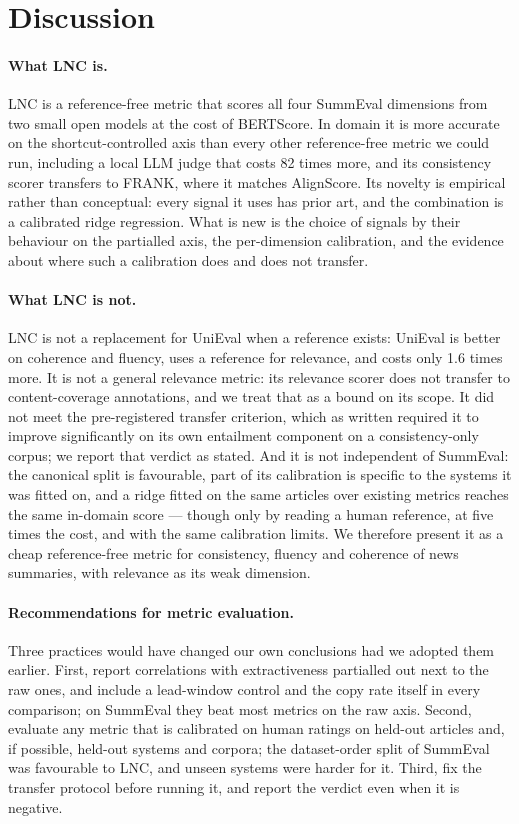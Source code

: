 \section{Discussion}
\label{sec:discussion}

\paragraph{What LNC is.} LNC is a reference-free metric that scores all four SummEval dimensions from two small open models at the cost of BERTScore. In domain it is more accurate on the shortcut-controlled axis than every other reference-free metric we could run, including a local LLM judge that costs 82 times more, and its consistency scorer transfers to FRANK, where it matches AlignScore. Its novelty is empirical rather than conceptual: every signal it uses has prior art, and the combination is a calibrated ridge regression. What is new is the choice of signals by their behaviour on the partialled axis, the per-dimension calibration, and the evidence about where such a calibration does and does not transfer.

\paragraph{What LNC is not.} LNC is not a replacement for UniEval when a reference exists: UniEval is better on coherence and fluency, uses a reference for relevance, and costs only 1.6 times more. It is not a general relevance metric: its relevance scorer does not transfer to content-coverage annotations, and we treat that as a bound on its scope. It did not meet the pre-registered transfer criterion, which as written required it to improve significantly on its own entailment component on a consistency-only corpus; we report that verdict as stated. And it is not independent of SummEval: the canonical split is favourable, part of its calibration is specific to the systems it was fitted on, and a ridge fitted on the same articles over existing metrics reaches the same in-domain score --- though only by reading a human reference, at five times the cost, and with the same calibration limits. We therefore present it as a cheap reference-free metric for consistency, fluency and coherence of news summaries, with relevance as its weak dimension.

\paragraph{Recommendations for metric evaluation.} Three practices would have changed our own conclusions had we adopted them earlier. First, report correlations with extractiveness partialled out next to the raw ones, and include a lead-window control and the copy rate itself in every comparison; on SummEval they beat most metrics on the raw axis. Second, evaluate any metric that is calibrated on human ratings on held-out articles and, if possible, held-out systems and corpora; the dataset-order split of SummEval was favourable to LNC, and unseen systems were harder for it. Third, fix the transfer protocol before running it, and report the verdict even when it is negative.


